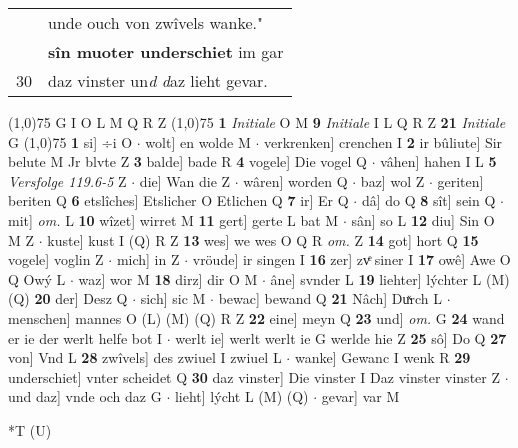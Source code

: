 \documentclass[8pt,a4paper,notitlepage]{article}
\begin{document}
\begin{table}[ht]
\begin{minipage}[t]{0.5\linewidth}
\begin{tabular}{rl}
 & unde ouch von zwîvels wanke."\\ 
 & \textbf{sîn muoter underschiet} im gar\\ 
30 & daz vinster un\textit{d} \textit{d}az lieht gevar.\\ 
\end{tabular}
\scriptsize
\line(1,0){75} \newline
G I O L M Q R Z \newline
\line(1,0){75} \newline
\textbf{1} \textit{Initiale} O M  \textbf{9} \textit{Initiale} I L Q R Z  \textbf{21} \textit{Initiale} G  \newline
\line(1,0){75} \newline
\textbf{1} si] ÷i O  $\cdot$ wolt] en wolde M  $\cdot$ verkrenken] crenchen I \textbf{2} ir bûliute] Sir belute M Jr blvte Z \textbf{3} balde] bade R \textbf{4} vogele] Die vogel Q  $\cdot$ vâhen] hahen I L \textbf{5} \textit{Versfolge 119.6-5} Z   $\cdot$ die] Wan die Z  $\cdot$ wâren] worden Q  $\cdot$ baz] wol Z  $\cdot$ geriten] beriten Q \textbf{6} etslîches] Etslicher O Etlichen Q \textbf{7} ir] Er Q  $\cdot$ dâ] do Q \textbf{8} sît] sein Q  $\cdot$ mit] \textit{om.} L \textbf{10} wîzet] wirret M \textbf{11} gert] gerte L bat M  $\cdot$ sân] so L \textbf{12} diu] Sin O M Z  $\cdot$ kuste] kust I (Q) R Z \textbf{13} wes] we wes O Q R \textit{om.} Z \textbf{14} got] hort Q \textbf{15} vogele] voglin Z  $\cdot$ mich] in Z  $\cdot$ vröude] ir singen I \textbf{16} zer] zvͤ siner I \textbf{17} owê] Awe O Q Owý L  $\cdot$ waz] wor M \textbf{18} dirz] dir O M  $\cdot$ âne] svnder L \textbf{19} liehter] lýchter L (M) (Q) \textbf{20} der] Desz Q  $\cdot$ sich] sic M  $\cdot$ bewac] bewand Q \textbf{21} Nâch] Duͯrch L  $\cdot$ menschen] mannes O (L) (M) (Q) R Z \textbf{22} eine] meyn Q \textbf{23} und] \textit{om.} G \textbf{24} wand er ie der werlt helfe bot I  $\cdot$ werlt ie] werlt werlt ie G werlde hie Z \textbf{25} sô] Do Q \textbf{27} von] Vnd L \textbf{28} zwîvels] des zwiuel I zwiuel L  $\cdot$ wanke] Gewanc I wenk R \textbf{29} underschiet] vnter scheidet Q \textbf{30} daz vinster] Die vinster I Daz vinster vinster Z  $\cdot$ und daz] vnde och daz G  $\cdot$ lieht] lýcht L (M) (Q)  $\cdot$ gevar] var M \newline
\end{minipage}
\hspace{0.5cm}
\begin{minipage}[t]{0.5\linewidth}
\small
\begin{center}*T (U)
\end{center}

\end{minipage}
\end{table}
\end{document}
